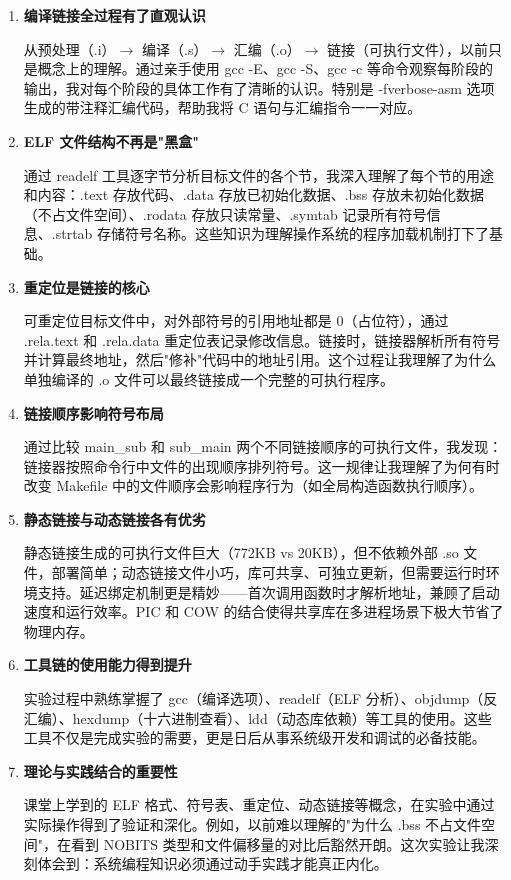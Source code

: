 \documentclass[12pt,a4paper]{ctexart}
\begin{document}
\begin{enumerate}[label=\arabic*.]
    \item \textbf{编译链接全过程有了直观认识}

    从预处理（.i）$\to$ 编译（.s）$\to$ 汇编（.o）$\to$ 链接（可执行文件），以前只是概念上的理解。通过亲手使用 gcc -E、gcc -S、gcc -c 等命令观察每阶段的输出，我对每个阶段的具体工作有了清晰的认识。特别是 -fverbose-asm 选项生成的带注释汇编代码，帮助我将 C 语句与汇编指令一一对应。

    \item \textbf{ELF 文件结构不再是"黑盒"}

    通过 readelf 工具逐字节分析目标文件的各个节，我深入理解了每个节的用途和内容：.text 存放代码、.data 存放已初始化数据、.bss 存放未初始化数据（不占文件空间）、.rodata 存放只读常量、.symtab 记录所有符号信息、.strtab 存储符号名称。这些知识为理解操作系统的程序加载机制打下了基础。

    \item \textbf{重定位是链接的核心}

    可重定位目标文件中，对外部符号的引用地址都是 0（占位符），通过 .rela.text 和 .rela.data 重定位表记录修改信息。链接时，链接器解析所有符号并计算最终地址，然后"修补"代码中的地址引用。这个过程让我理解了为什么单独编译的 .o 文件可以最终链接成一个完整的可执行程序。

    \item \textbf{链接顺序影响符号布局}

    通过比较 main\_sub 和 sub\_main 两个不同链接顺序的可执行文件，我发现：链接器按照命令行中文件的出现顺序排列符号。这一规律让我理解了为何有时改变 Makefile 中的文件顺序会影响程序行为（如全局构造函数执行顺序）。

    \item \textbf{静态链接与动态链接各有优劣}

    静态链接生成的可执行文件巨大（772KB vs 20KB），但不依赖外部 .so 文件，部署简单；动态链接文件小巧，库可共享、可独立更新，但需要运行时环境支持。延迟绑定机制更是精妙——首次调用函数时才解析地址，兼顾了启动速度和运行效率。PIC 和 COW 的结合使得共享库在多进程场景下极大节省了物理内存。

    \item \textbf{工具链的使用能力得到提升}

    实验过程中熟练掌握了 gcc（编译选项）、readelf（ELF 分析）、objdump（反汇编）、hexdump（十六进制查看）、ldd（动态库依赖）等工具的使用。这些工具不仅是完成实验的需要，更是日后从事系统级开发和调试的必备技能。

    \item \textbf{理论与实践结合的重要性}

    课堂上学到的 ELF 格式、符号表、重定位、动态链接等概念，在实验中通过实际操作得到了验证和深化。例如，以前难以理解的"为什么 .bss 不占文件空间"，在看到 NOBITS 类型和文件偏移量的对比后豁然开朗。这次实验让我深刻体会到：系统编程知识必须通过动手实践才能真正内化。
\end{enumerate}
\end{document}
